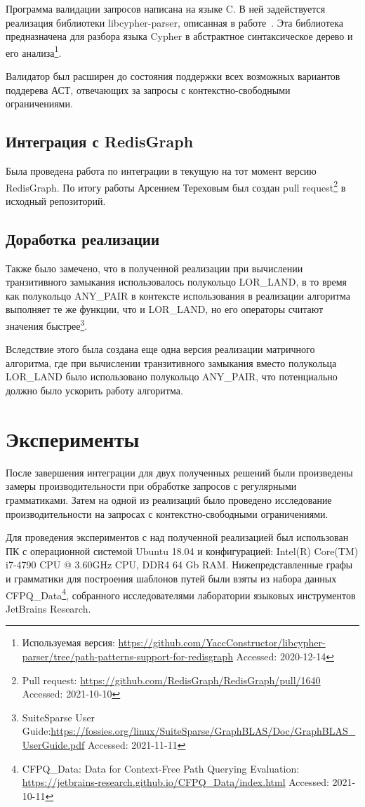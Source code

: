 \documentclass[14pt]{matmex-diploma-custom}
\begin{document}
Программа валидации запросов написана на языке C. В ней задействуется реализация библиотеки libcypher-parser, описанная в работе~\cite{Timur-diploma}. Эта библиотека предназначена для разбора языка Cypher в абстрактное синтаксическое дерево и его анализа\footnote{Используемая версия: \url{https://github.com/YaccConstructor/libcypher-parser/tree/path-patterns-support-for-redisgraph} Accessed: 2020-12-14}. 

Валидатор был расширен до состояния поддержки всех возможных вариантов поддерева АСТ, отвечающих за запросы с контекстно-свободными ограничениями.

\subsection{Интеграция с RedisGraph}
Была проведена работа по интеграции в текущую на тот момент версию RedisGraph. По итогу работы Арсением Тереховым был создан pull request\footnote{Pull request: \url{https://github.com/RedisGraph/RedisGraph/pull/1640} Accessed: 2021-10-10} в исходный репозиторий. 

\subsection{Доработка реализации}
Также было замечено, что в полученной реализации при вычислении транзитивного замыкания использовалось полукольцо LOR\_LAND, в то время как полукольцо ANY\_PAIR в контексте использования в реализации алгоритма выполняет те же функции, что и LOR\_LAND, но его операторы считают значения быстрее\footnote{SuiteSparse User Guide:\url{https://fossies.org/linux/SuiteSparse/GraphBLAS/Doc/GraphBLAS\_UserGuide.pdf} Accessed: 2021-11-11}.

Вследствие этого была создана еще одна версия реализации матричного алгоритма, где при вычислении транзитивного замыкания вместо полукольца LOR\_LAND было использовано полукольцо ANY\_PAIR, что потенциально должно было ускорить работу алгоритма.

\section{Эксперименты}
После завершения интеграции для двух полученных решений были произведены замеры производительности при обработке запросов с регулярными грамматиками. Затем на одной из реализаций было проведено исследование производительности на запросах с контекстно-свободными ограничениями.

Для проведения экспериментов с над полученной реализацией был использован ПК с операционной системой Ubuntu 18.04 и конфигурацией: Intel(R) Core(TM) i7-4790 CPU @ 3.60GHz CPU, DDR4 64 Gb RAM. Нижепредставленные графы и грамматики для построения шаблонов путей были взяты из набора данных CFPQ\_Data\footnote{CFPQ\_Data: Data for Context-Free Path Querying Evaluation: \url{https://jetbrains-research.github.io/CFPQ\_Data/index.html} Accessed: 2021-10-11}, собранного исследователями лаборатории языковых инструментов JetBrains
Research.  
\end{document}
